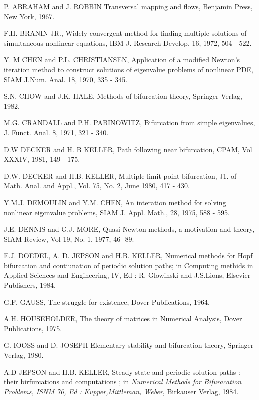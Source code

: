 \begin{thebibliography}{99} 
 {P. ABRAHAM and J. ROBBIN} Transversal mapping and flows,
  Benjamin Press, New York, 1967. 

 {F.H. BRANIN JR.,} Widely convergent method for finding
  multiple solutions of simultaneous nonlinear equations, IBM
  J. Research Develop. 16, 1972, 504 - 522. 

 {Y. M CHEN and P.L. CHRISTIANSEN,} Application of a
  modified Newton's iteration method to construct solutions of
  eigenvalue problems of nonlinear PDE, SIAM J.Num. Anal. 18,
  1970, 335 - 345. 

 {S.N. CHOW and J.K. HALE,} Methods of bifurcation theory,
  Springer Verlag, 1982. 

 {M.G. CRANDALL and P.H. PABINOWITZ,} Bifurcation from
  simple eigenvalues, J. Funct. Anal. 8, 1971, 321 - 340. 

 { D.W DECKER and H. B KELLER,} Path following near
  bifurcation, CPAM, Vol XXXIV, 1981, 149 - 175. 

 {D.W. DECKER and H.B. KELLER,} Multiple limit point
  bifurcation, J1. of Math. Anal. and Appl., Vol. 75, No. 2, June
  1980, 417 - 430. 

 {Y.M.J. DEMOULIN 	and Y.M. CHEN,} An interation method
  for solving nonlinear eigcnvalue problems, SIAM J. Appl. Math., 28,
  1975, 588 - 595. 

 {J.E. DENNIS and G.J. MORE,} Quasi Newton methods, a
  motivation and theory, SIAM Review, Vol 19, No. 1, 1977, 46-
  89. 

 {E.J. DOEDEL, A. D. JEPSON and H.B. KELLER,} Numerical
  methods for Hopf bifurcation and contiunation of periodic solution
  paths; in Computing methids in Applied Sciences and Engineering,
  IV, Ed : R. Glowinski and J.S.Lions, Elsevier Publishers,
  1984. 

 {G.F. GAUSS,} The struggle for existence, Dover
  Publications, 1964. 

 {A.H. HOUSEHOLDER,} The theory of matrices in Numerical
  Analysis, Dover Publications, 1975.

 {G. IOOSS and D. JOSEPH} Elementary stability and
  bifurcation theory, Springer Verlag, 1980. 

 {A.D JEPSON and H.B. KELLER,} Steady state and periodic
  solution paths : their birfurcations and computations ; in \textit{Numerical
  Methods for Bifuracation Problems, ISNM 70, Ed : Kupper,Mittleman,
  Weber}, Birkauser Verlag, 1984. 


\end{thebibliography}
